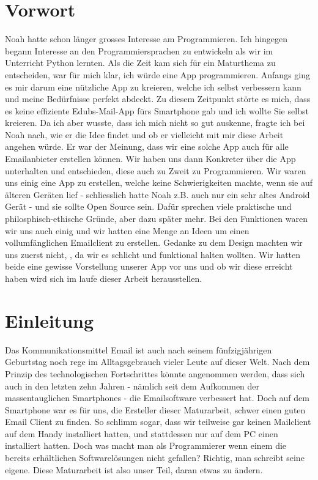 \documentclass[a4paper,11pt]{article}
\begin{document}
\tableofcontents
\pagebreak

\section{Vorwort}
Noah hatte schon länger grosses Interesse am Programmieren. Ich hingegen begann Interesse an den Programmiersprachen zu entwickeln als wir im Unterricht 
Python lernten. Als die Zeit kam sich für ein Maturthema zu entscheiden, war für mich klar, ich würde eine App programmieren. Anfangs ging es mir darum eine 
nützliche App zu kreieren, welche ich selbst verbessern kann und meine Bedürfnisse perfekt abdeckt.
Zu diesem Zeitpunkt störte es mich, dass es keine effiziente Edubs-Mail-App fürs Smartphone gab und ich wollte Sie selbst kreieren. 
Da ich aber wusste, dass ich mich nicht so gut auskenne, fragte ich bei Noah nach, wie er die Idee findet und ob er vielleicht mit mir diese Arbeit 
angehen würde. Er war der Meinung, dass wir eine solche App auch für alle Emailanbieter erstellen können. Wir haben uns dann Konkreter über die App unterhalten und entschieden, diese auch zu Zweit 
zu Programmieren. Wir waren uns einig eine App zu erstellen, welche keine Schwierigkeiten machte, wenn sie auf älteren Geräten lief - schliesslich hatte Noah z.B. auch nur ein sehr altes Android Gerät - und sie sollte Open Source sein. Dafür sprechen viele praktische und philosphisch-ethische Gründe, aber dazu später mehr.
Bei den Funktionen waren wir uns auch einig und wir hatten eine Menge an Ideen um einen vollumfänglichen Emailclient zu erstellen. Gedanke zu dem Design machten wir uns zuerst nicht,
, da wir es schlicht und funktional halten wollten. 
Wir hatten beide eine gewisse Vorstellung unserer App vor uns und ob wir diese erreicht haben wird sich im laufe dieser Arbeit herausstellen. 

\section{Einleitung}
Das Kommunikationsmittel Email ist auch nach seinem fünfzigjährigen Geburtstag noch rege im Alltagsgebrauch vieler Leute auf dieser Welt.
Nach dem Prinzip des technologischen Fortschrittes könnte angenommen werden, dass sich auch in den letzten zehn Jahren - nämlich seit dem Aufkommen der massentauglichen Smartphones - 
die Emailsoftware verbessert hat. Doch auf dem Smartphone war es für uns, die Ersteller dieser Maturarbeit, schwer einen guten Email Client zu finden. So schlimm sogar, dass wir teilweise gar keinen Mailclient auf dem Handy installiert hatten, und stattdessen nur auf dem PC einen installiert hatten. Doch was macht man als Programmierer wenn einem die bereits erhältlichen Softwarelösungen nicht gefallen? Richtig, man schreibt seine eigene. Diese Maturarbeit ist also unser Teil, daran etwas zu ändern.
\end{document}
